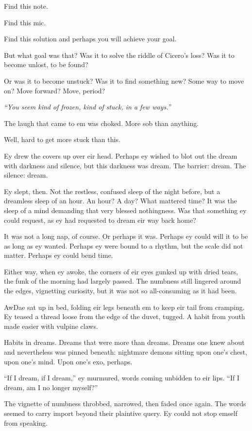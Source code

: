 Find this note.

Find this mic.

Find this solution and perhaps you will achieve your goal.

But what goal was that? Was it to solve the riddle of Cicero's loss? Was it to become unlost, to be found?

Or was it to become unstuck? Was it to find something new? Some way to move on? Move forward? Move, period?

\emph{``You seem kind of frozen, kind of stuck, in a few ways.''}

The laugh that came to em was choked. More sob than anything.

Well, hard to get more stuck than this.

Ey drew the covers up over eir head. Perhaps ey wished to blot out the dream with darkness and silence, but this darkness was dream. The barrier: dream. The silence: dream.

Ey slept, then. Not the restless, confused sleep of the night before, but a dreamless sleep of an hour. An hour? A day? What mattered time? It was the sleep of a mind demanding that very blessed nothingness. Was that something ey could request, as ey had requested to dream eir way back home?

It was not a long nap, of course. Or perhaps it was. Perhaps ey could will it to be as long as ey wanted. Perhaps ey were bound to a rhythm, but the scale did not matter. Perhaps ey could bend time.

Either way, when ey awoke, the corners of eir eyes gunked up with dried tears, the funk of the morning had largely passed. The numbness still lingered around the edges, vignetting curiosity, but it was not so all-consuming as it had been.

AwDae sat up in bed, folding eir legs beneath em to keep eir tail from cramping. Ey teased a thread loose from the edge of the duvet, tugged. A habit from youth made easier with vulpine claws.

Habits in dreams. Dreams that were more than dreams. Dreams one knew about and nevertheless was pinned beneath: nightmare demons sitting upon one's chest, upon one's mind. Upon one's exo, perhaps.

``If I dream, if I dream,'' ey murmured, words coming unbidden to eir lips. ``If I dream, am I no longer myself?''

The vignette of numbness throbbed, narrowed, then faded once again. The words seemed to carry import beyond their plaintive query. Ey could not stop emself from speaking.

